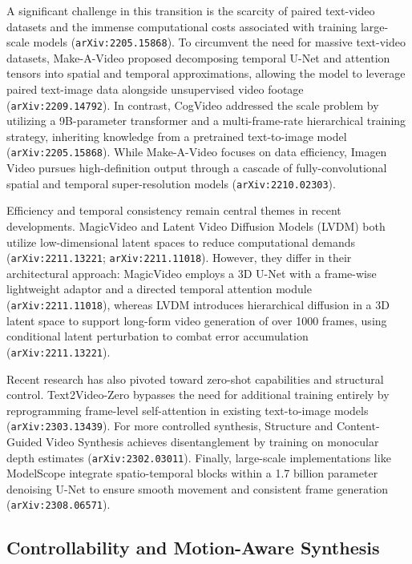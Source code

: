 \documentclass[11pt]{article}
\begin{document}
A significant challenge in this transition is the scarcity of paired text-video datasets and the immense computational costs associated with training large-scale models (\texttt{arXiv:2205.15868}). To circumvent the need for massive text-video datasets, Make-A-Video proposed decomposing temporal U-Net and attention tensors into spatial and temporal approximations, allowing the model to leverage paired text-image data alongside unsupervised video footage (\texttt{arXiv:2209.14792}). In contrast, CogVideo addressed the scale problem by utilizing a 9B-parameter transformer and a multi-frame-rate hierarchical training strategy, inheriting knowledge from a pretrained text-to-image model (\texttt{arXiv:2205.15868}). While Make-A-Video focuses on data efficiency, Imagen Video pursues high-definition output through a cascade of fully-convolutional spatial and temporal super-resolution models (\texttt{arXiv:2210.02303}).

Efficiency and temporal consistency remain central themes in recent developments. MagicVideo and Latent Video Diffusion Models (LVDM) both utilize low-dimensional latent spaces to reduce computational demands (\texttt{arXiv:2211.13221}; \texttt{arXiv:2211.11018}). However, they differ in their architectural approach: MagicVideo employs a 3D U-Net with a frame-wise lightweight adaptor and a directed temporal attention module (\texttt{arXiv:2211.11018}), whereas LVDM introduces hierarchical diffusion in a 3D latent space to support long-form video generation of over 1000 frames, using conditional latent perturbation to combat error accumulation (\texttt{arXiv:2211.13221}).

Recent research has also pivoted toward zero-shot capabilities and structural control. Text2Video-Zero bypasses the need for additional training entirely by reprogramming frame-level self-attention in existing text-to-image models (\texttt{arXiv:2303.13439}). For more controlled synthesis, Structure and Content-Guided Video Synthesis achieves disentanglement by training on monocular depth estimates (\texttt{arXiv:2302.03011}). Finally, large-scale implementations like ModelScope integrate spatio-temporal blocks within a 1.7 billion parameter denoising U-Net to ensure smooth movement and consistent frame generation (\texttt{arXiv:2308.06571}).

\subsection{Controllability and Motion-Aware Synthesis}
\end{document}
